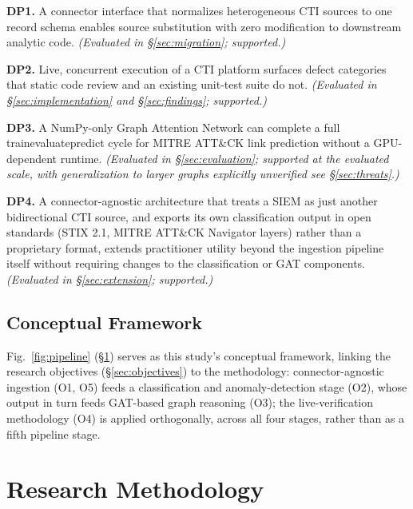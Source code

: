 \documentclass[conference]{IEEEtran}
\begin{document}
\textbf{DP1.} A connector interface that normalizes heterogeneous CTI sources to one record schema enables source substitution with zero modification to downstream analytic code. \emph{(Evaluated in \S\ref{sec:migration}; supported.)}

\textbf{DP2.} Live, concurrent execution of a CTI platform surfaces defect categories that static code review and an existing unit-test suite do not. \emph{(Evaluated in \S\ref{sec:implementation} and \S\ref{sec:findings}; supported.)}

\textbf{DP3.} A NumPy-only Graph Attention Network can complete a full train\textendash evaluate\textendash predict cycle for MITRE ATT\&CK link prediction without a GPU-dependent runtime. \emph{(Evaluated in \S\ref{sec:evaluation}; supported at the evaluated scale, with generalization to larger graphs explicitly unverified \textemdash{} see \S\ref{sec:threats}.)}

\textbf{DP4.} A connector-agnostic architecture that treats a SIEM as just another bidirectional CTI source, and exports its own classification output in open standards (STIX 2.1, MITRE ATT\&CK Navigator layers) rather than a proprietary format, extends practitioner utility beyond the ingestion pipeline itself without requiring changes to the classification or GAT components. \emph{(Evaluated in \S\ref{sec:extension}; supported.)}

\subsection{Conceptual Framework}
Fig.~\ref{fig:pipeline} (\S\ref{sec:methodology}) serves as this study's conceptual framework, linking the research objectives (\S\ref{sec:objectives}) to the methodology: connector-agnostic ingestion (O1, O5) feeds a classification and anomaly-detection stage (O2), whose output in turn feeds GAT-based graph reasoning (O3); the live-verification methodology (O4) is applied orthogonally, across all four stages, rather than as a fifth pipeline stage.

\section{Research Methodology}
\label{sec:methodology}
\end{document}
